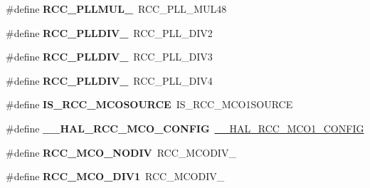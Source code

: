 \begin{DoxyCompactItemize}
\#define {\bfseries R\+C\+C\+\_\+\+P\+L\+L\+M\+U\+L\+\_}~R\+C\+C\+\_\+\+P\+L\+L\+\_\+\+M\+U\+L48
\item 
\mbox{\label{group___h_a_l___r_c_c___aliased_ga3b43997b2f4c57fb68632db0ff63ef77}} 
\#define {\bfseries R\+C\+C\+\_\+\+P\+L\+L\+D\+I\+V\+\_}~R\+C\+C\+\_\+\+P\+L\+L\+\_\+\+D\+I\+V2
\item 
\mbox{\label{group___h_a_l___r_c_c___aliased_ga64492e160608f79d4c3c751f82d09dfc}} 
\#define {\bfseries R\+C\+C\+\_\+\+P\+L\+L\+D\+I\+V\+\_}~R\+C\+C\+\_\+\+P\+L\+L\+\_\+\+D\+I\+V3
\item 
\mbox{\label{group___h_a_l___r_c_c___aliased_gaa25c3a8a7576db9c75ea868632d86120}} 
\#define {\bfseries R\+C\+C\+\_\+\+P\+L\+L\+D\+I\+V\+\_}~R\+C\+C\+\_\+\+P\+L\+L\+\_\+\+D\+I\+V4
\item 
\mbox{\label{group___h_a_l___r_c_c___aliased_ga6ae382b78e1bcec3da6d5ac79b1a5551}} 
\#define {\bfseries I\+S\+\_\+\+R\+C\+C\+\_\+\+M\+C\+O\+S\+O\+U\+R\+CE}~I\+S\+\_\+\+R\+C\+C\+\_\+\+M\+C\+O1\+S\+O\+U\+R\+CE
\item 
\mbox{\label{group___h_a_l___r_c_c___aliased_ga4a5994f41cd6798807bf8672ec3dc423}} 
\#define {\bfseries \+\_\+\+\_\+\+H\+A\+L\+\_\+\+R\+C\+C\+\_\+\+M\+C\+O\+\_\+\+C\+O\+N\+F\+IG}~\mbox{\hyperlink{group___r_c_c_ex___m_c_ox___clock___config_ga7e5f7f1efc92794b6f0e96068240b45e}{\+\_\+\+\_\+\+H\+A\+L\+\_\+\+R\+C\+C\+\_\+\+M\+C\+O1\+\_\+\+C\+O\+N\+F\+IG}}
\item 
\mbox{\label{group___h_a_l___r_c_c___aliased_ga897ae3aa8cfe31f7b00de98637db45d5}} 
\#define {\bfseries R\+C\+C\+\_\+\+M\+C\+O\+\_\+\+N\+O\+D\+IV}~R\+C\+C\+\_\+\+M\+C\+O\+D\+I\+V\+\_
\item 
\mbox{\label{group___h_a_l___r_c_c___aliased_ga411caf05a68e3bd8f14150c14d1f8404}} 
\#define {\bfseries R\+C\+C\+\_\+\+M\+C\+O\+\_\+\+D\+I\+V1}~R\+C\+C\+\_\+\+M\+C\+O\+D\+I\+V\+\_
\item 
\mbox{\label{group___h_a_l___r_c_c___aliased_ga49e93c717ea6b0916051b085aa595ecb}} 

\end{DoxyCompactItemize}
